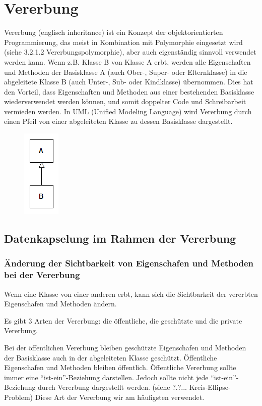 \section{Vererbung}
	Vererbung (englisch inheritance) ist ein Konzept der objektorientierten Programmierung, das meist in Kombination mit
	Polymorphie eingesetzt wird (siehe 3.2.1.2 Vererbungspolymorphie), aber auch eigenständig sinnvoll verwendet werden kann.
	Wenn z.B. Klasse B von Klasse A erbt, werden alle Eigenschaften und Methoden der Basisklasse A (auch Ober-, Super- oder
	Elternklasse) in die abgeleitete Klasse B (auch Unter-, Sub- oder Kindklasse) übernommen. Dies hat den Vorteil, dass
	Eigenschaften und Methoden aus einer bestehenden Basisklasse wiederverwendet werden können, und somit doppelter Code und
	Schreibarbeit vermieden werden. In UML (Unified Modeling Language) wird Vererbung durch einen Pfeil von einer abgeleiteten
	Klasse zu dessen Basisklasse dargestellt.
	
	\begin{figure}[h]
		\includegraphics[scale=0.75]{vererbung/uml.png}
	\end{figure}
	
	\subsection{Datenkapselung im Rahmen der Vererbung}
		
		\subsubsection{Änderung der Sichtbarkeit von Eigenschafen und Methoden bei der Vererbung}
			
			Wenn eine Klasse von einer anderen erbt, kann sich die Sichtbarkeit der vererbten Eigenschafen und Methoden ändern.
			
			
			
			Es gibt 3 Arten der Vererbung: die öffentliche, die geschützte und die private Vererbung.
			
			Bei der öffentlichen Vererbung bleiben geschützte Eigenschafen und Methoden der Basisklasse auch in der
			abgeleiteten Klasse geschützt. Öffentliche Eigenschafen und Methoden bleiben öffentlich. Öffentliche Vererbung
			sollte immer eine ``ist-ein''-Beziehung darstellen. Jedoch sollte nicht jede ``ist-ein''-Beziehung durch Vererbung
			dargestellt werden. (siehe ?.?... Kreis-Ellipse-Problem) Diese Art der Vererbung wir am häufigsten verwendet.
			
